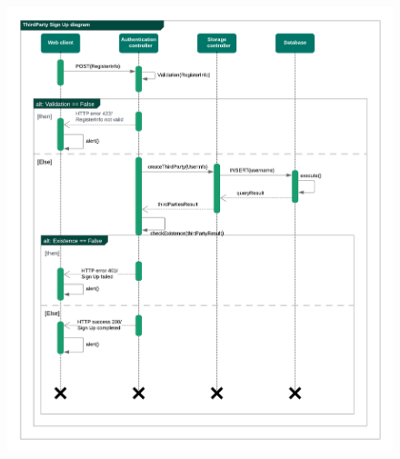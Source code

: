 \begin{legal}
\begin{legal}
\begin{figure}[H]
				\includegraphics[width=\linewidth]{images/seq_diagrams/thirdPartySignUpSeq.png}\\
				\end{figure}
				

\end{legal}
\end{legal}
